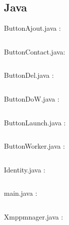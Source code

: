 \documentclass[11pt]{report}
\begin{document}
\subsection{Java}
ButtonAjout.java :
\inputminted[tabsize=2,frame=lines,linenos]{Java}{../src/ButtonAjout.java}\newpage
ButtonContact.java:
\inputminted[tabsize=2,frame=lines,linenos]{Java}{../src/ButtonContact.java}\newpage ButtonDel.java :
\inputminted[tabsize=2,frame=lines,linenos]{Java}{../src/ButtonDel.java}\newpage ButtonDoW.java :
\inputminted[tabsize=2,frame=lines,linenos]{Java}{../src/ButtonDoW.java}\newpage ButtonLaunch.java :
\inputminted[tabsize=2,frame=lines,linenos]{Java}{../src/ButtonLaunch.java}\newpage ButtonWorker.java :
\inputminted[tabsize=2,frame=lines,linenos]{Java}{../src/ButtonWorker.java}\newpage Identity.java :
\inputminted[tabsize=2,frame=lines,linenos]{Java}{../src/Identity.java}\newpage
main.java :
\inputminted[tabsize=2,frame=lines,linenos]{Java}{../src/main.java}\newpage
Xmppmnager.java :
\inputminted[tabsize=2,frame=lines,linenos]{Java}{../src/XmppManager.java}
\end{document}
